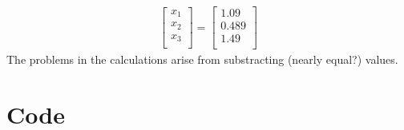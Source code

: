 \documentclass[a4paper,12pt]{scrartcl}
\begin{document}
\begin{align*}
    \begin{bmatrix}
        x_1 \\
        x_2 \\
        x_3 \\
    \end{bmatrix}
=
    \begin{bmatrix}
        1.09 \\
        0.489 \\
        1.49 \\
    \end{bmatrix}
\end{align*}
The problems in the calculations arise from substracting (nearly equal?) values.
\clearpage
\appendix
\lstset{basicstyle=\ttfamily, numbers=left, numberstyle=\tiny, stepnumber=1, numbersep=5pt}
\gdef\thesection{Appendix \arabic{section}.}
\clearpage

\section{Code\label{LiiteA}}

\clearpage
\end{document}
